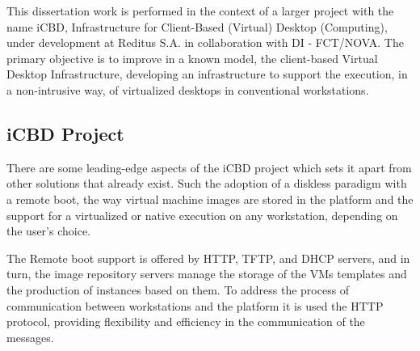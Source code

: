 This dissertation work is performed in the context of a larger project with the name iCBD, Infrastructure for Client-Based (Virtual) Desktop (Computing), under development at Reditus S.A. in collaboration with DI - FCT/NOVA.
The primary objective is to improve in a known model, the client-based Virtual Desktop Infrastructure, developing an infrastructure to support the execution, in a non-intrusive way, of virtualized desktops in conventional workstations.





\subsection{iCBD Project} %
\label{sub:icbd_project}


There are some leading-edge aspects of the iCBD project which sets it apart from other solutions that already exist. Such the adoption of a diskless paradigm with a remote boot, the way virtual machine images are stored in the platform and the support for a virtualized or native execution on any workstation, depending on the user's choice.~\cite{P2020}

The Remote boot support is offered by HTTP, TFTP, and DHCP servers, and in turn, the image repository servers manage the storage of the VMs templates and the production of instances based on them.
To address the process of communication between workstations and the platform it is used the HTTP protocol, providing flexibility and efficiency in the communication of the messages.~\cite{P2020,Nuno2016,Eduardo2016}

